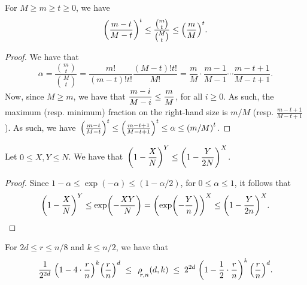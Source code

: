 \begin{lemma}%
    For $M \geq m \geq t\geq 0$, we have
    \[
    \pth{\frac{m-t}{M-t}}^t\leq \frac{\binom{m}{t}}{\binom{M}{t}}
    \leq \pth{\frac{m}{M}}^t.
    \]
\end{lemma}
\begin{proof}
    We have that
    \[
    \alpha = \frac{\binom{m}{t}}{\binom{M}{t}} =
    \frac{m!}{(m-t)!t!}  \frac{(M-t)!t!}{M!} = \frac{m}{M} \cdot
    \frac{m-1}{M-1} \cdots \frac{m-t+1}{M-t+1}.
    \]
    Now, since $M \geq
    m$, we have that $\displaystyle \frac{m-i}{M-i} \leq \frac{m}{M}$, for all
    $i \geq 0$. As such, the maximum (resp. minimum) fraction on the
    right-hand size is $m/M$ (resp. $\frac{m-t+1}{M-t+1}$). As such,
    we have $\,\pth{\frac{m-t}{M-t}}^t \leq
    \pth{\frac{m-t+1}{M-t+1}}^t \leq \alpha \leq \pth{m/M}^t$.
\end{proof}


\begin{lemma}
    Let $0 \leq X, Y \leq N$. We have that
    $\,\ds\pth{1-\frac{X}{N}}^Y \leq \pth{1-\frac{Y}{2N}}^X$.
\end{lemma}

\begin{proof}
    Since $1-\alpha \leq \exp(-\alpha) \leq (1-\alpha/2)$, for $0 \leq
    \alpha \leq 1$, it follows that
    \begin{equation*}
        \pth{1-\frac{X}{N}}^Y %
        \leq%
        \exp \pth{ -\frac{XY}{N}}%
        =%
        \pth{\exp \pth{ -\frac{Y}{n}} }^X%
        \leq%
        \pth{ 1 -\frac{Y}{2n}}^X.
    \end{equation*}
\end{proof}


\begin{lemma}
    For $2d \leq r \leq n/8$ and $k \leq n/2$, we have that
    \begin{equation*}
        \ds \frac{1}{2^{2d}} \; \pth{ 1 - 4 \cdot \frac{ r}{n} }^{k}
        \pth{\frac{r}{n}}^d \;\leq \; \CSProbFull{r}{d}{k}{n} \;\leq\;
        2^{2d} \; \pth{ 1 - \frac{1}{2} \cdot \frac{r}{n} }^{k}
        \,\pth{\frac{r}{n}}^d.
    \end{equation*}
\end{lemma}

